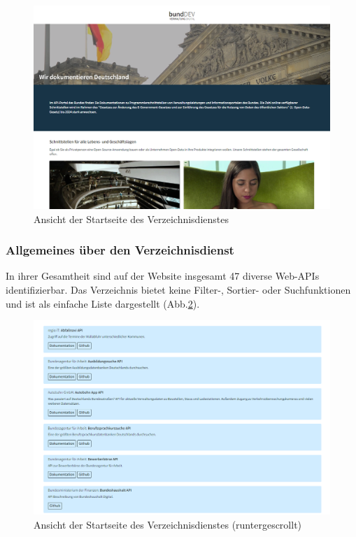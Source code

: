 \documentclass[notitlepage, hidelinks]{article}
\begin{document}
\begin{figure}[H]
\centering
  \includegraphics[width=\textwidth]{images/bundwebsite.png}
  \caption{Ansicht der Startseite des Verzeichnisdienstes}
  \label{bundwebsite}
\end{figure}


\subsubsection{Allgemeines über den Verzeichnisdienst}
In ihrer Gesamtheit sind auf der Website insgesamt 47 diverse Web-APIs identifizierbar. Das Verzeichnis bietet keine Filter-, Sortier- oder Suchfunktionen und ist als einfache Liste dargestellt (Abb.\ref{bundwebsite2}). 

\begin{figure}[H]
\centering
  \includegraphics[width=\textwidth]{images/bundwebsite2.png}
  \caption{Ansicht der Startseite des Verzeichnisdienstes (runtergescrollt)}
  \label{bundwebsite2}
\end{figure}
\end{document}
